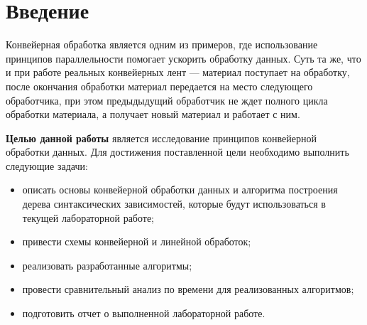 \chapter*{Введение}

Конвейерная обработка является одним из примеров, где использование принципов параллельности помогает ускорить обработку данных. 
Суть та же, что и при работе реальных конвейерных лент --- материал поступает на обработку, после окончания обработки материал передается на место следующего обработчика, при этом предыдыдущий обработчик не ждет полного цикла обработки материала, а получает новый материал и работает с ним.


\textbf{Целью данной работы} является исследование принципов конвейерной обработки данных. 
Для достижения поставленной цели необходимо выполнить следующие задачи:
\begin{itemize}[label=---]
	\item описать основы конвейерной обработки данных и алгоритма построения дерева синтаксических зависимостей, которые будут использоваться в текущей лабораторной работе;
    \item привести схемы конвейерной и линейной обработок;
    \item реализовать разработанные алгоритмы;
    \item провести сравнительный анализ по времени для реализованных алгоритмов;
    \item подготовить отчет о выполненной лабораторной работе.
\end{itemize}
